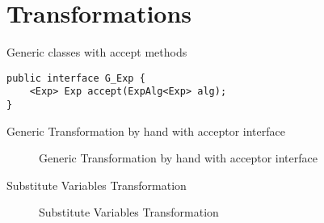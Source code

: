 \section{Transformations}\label{sec:transformations}
\label{retroimp}

Generic classes with accept methods
\begin{lstlisting}[numbers=none] 
public interface G_Exp {
	<Exp> Exp accept(ExpAlg<Exp> alg);
}
\end{lstlisting}

Generic Transformation by hand with acceptor interface
\begin{figure}[tb]
\vspace{-.1in}
\caption{Generic Transformation by hand with acceptor interface\label{sec:transformations}}
\end{figure}

Substitute Variables Transformation
\begin{figure}[tb]
\vspace{-.1in}
\caption{Substitute Variables Transformation\label{sec:transformations}}
\end{figure}
